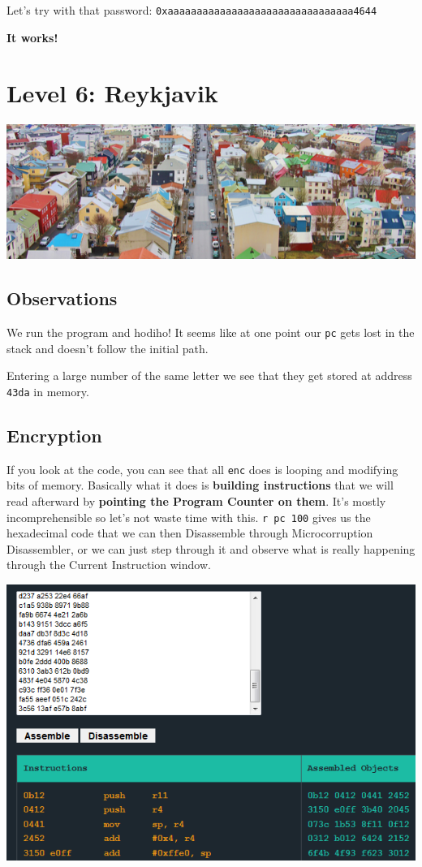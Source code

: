 Let's try with that password:
\texttt{0xaaaaaaaaaaaaaaaaaaaaaaaaaaaaaaaa4644}

\textbf{It works!}

\section{Level 6: Reykjavik}\label{level-6-reykjavik}

\includegraphics{img/6_1.PNG}

\subsection{Observations}\label{observations-2}

We run the program and hodiho! It seems like at one point our
\texttt{pc} gets lost in the stack and doesn't follow the initial path.

Entering a large number of the same letter we see that they get stored
at address \texttt{43da} in memory.

\subsection{Encryption}\label{encryption}

If you look at the code, you can see that all \texttt{enc} does is
looping and modifying bits of memory. Basically what it does is
\textbf{building instructions} that we will read afterward by
\textbf{pointing the Program Counter on them}. It's mostly
incomprehensible so let's not waste time with this. \texttt{r pc 100}
gives us the hexadecimal code that we can then Disassemble through
Microcorruption Disassembler, or we can just step through it and observe
what is really happening through the Current Instruction window.

\includegraphics{img/6_3.PNG}


